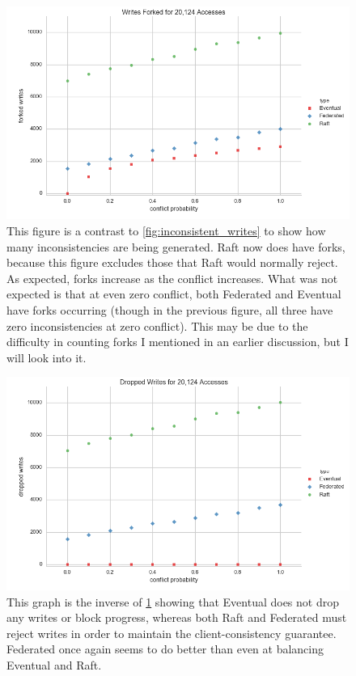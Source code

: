 \documentclass[11pt,letterpaper]{article}
\begin{document}
\begin{figure}[!h]
    \centering
        \includegraphics[width=\textwidth]{figures/forked_writes.png}
        \caption{\textsf{This figure is a contrast to \ref{fig:inconsistent_writes} to show how many inconsistencies are being generated. Raft now does have forks, because this figure excludes those that Raft would normally reject. As expected, forks increase as the conflict increases. What was not expected is that at even zero conflict, both Federated and Eventual have forks occurring (though in the previous figure, all three have zero inconsistencies at zero conflict). This may be due to the difficulty in counting forks I mentioned in an earlier discussion, but I will look into it.}}
        \label{fig:forked_writes}
\end{figure}


\begin{figure}[!h]
    \centering
        \includegraphics[width=\textwidth]{figures/dropped_writes.png}
        \caption{\textsf{This graph is the inverse of \ref{fig:forked_writes} showing that Eventual does not drop any writes or block progress, whereas both Raft and Federated must reject writes in order to maintain the client-consistency guarantee. Federated once again seems to do better than even at balancing Eventual and Raft. }}
        \label{fig:dropped_writes}
\end{figure}
\end{document}
